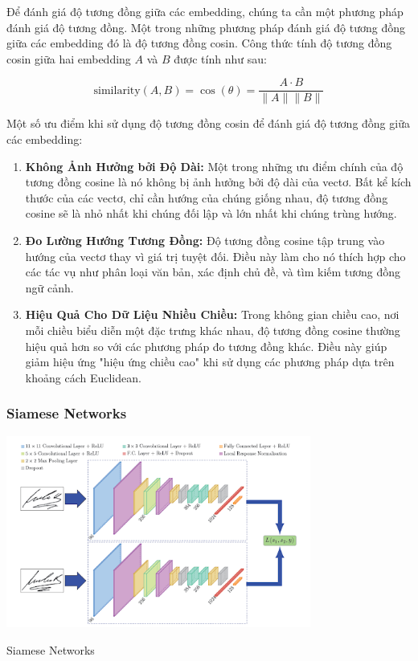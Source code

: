 \documentclass[a4paper, 12pt, openany]{book}
\begin{document}
Để đánh giá độ tương đồng giữa các embedding, chúng ta cần một phương pháp đánh giá độ tương đồng. Một trong những phương pháp đánh giá độ tương đồng giữa các embedding đó là độ tương đồng cosin. Công thức tính độ tương đồng cosin giữa hai embedding $A$ và $B$ được tính như sau:

\begin{equation}
    \text{similarity}(A, B) = \cos(\theta) = \frac{A \cdot B}{\|A\| \|B\|}
\end{equation}

Một số ưu điểm khi sử dụng độ tương đồng cosin để đánh giá độ tương đồng giữa các embedding:
\begin{enumerate}
    \item \textbf{Không Ảnh Hưởng bởi Độ Dài:} Một trong những ưu điểm chính của độ tương đồng cosine là nó không bị ảnh hưởng bởi độ dài của vectơ. Bất kể kích thước của các vectơ, chỉ cần hướng của chúng giống nhau, độ tương đồng cosine sẽ là nhỏ nhất khi chúng đối lập và lớn nhất khi chúng trùng hướng.

    \item \textbf{Đo Lường Hướng Tương Đồng:} Độ tương đồng cosine tập trung vào hướng của vectơ thay vì giá trị tuyệt đối. Điều này làm cho nó thích hợp cho các tác vụ như phân loại văn bản, xác định chủ đề, và tìm kiếm tương đồng ngữ cảnh.

    \item \textbf{Hiệu Quả Cho Dữ Liệu Nhiều Chiều:} Trong không gian chiều cao, nơi mỗi chiều biểu diễn một đặc trưng khác nhau, độ tương đồng cosine thường hiệu quả hơn so với các phương pháp đo tương đồng khác. Điều này giúp giảm hiệu ứng "hiệu ứng chiều cao" khi sử dụng các phương pháp dựa trên khoảng cách Euclidean.
\end{enumerate}

\subsubsection{Siamese Networks}

\begin{minipage}{\linewidth}
    \captionsetup{type=figure}
    \centering
    \includegraphics[width=10cm]{./assets/images/1_siamese-network.png}
    \caption{Siamese Networks\cite{https://builtin.com/machine-learning/siamese-network}}
\end{minipage} 
\end{document}
